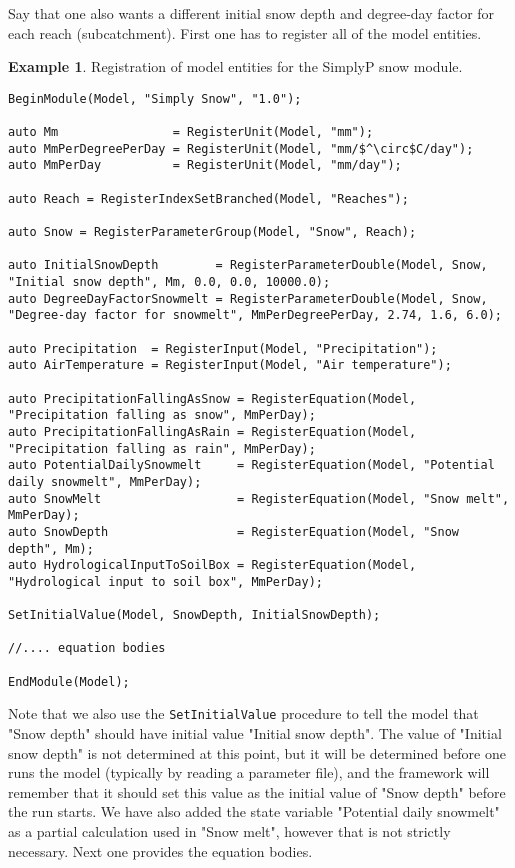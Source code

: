 \documentclass[11pt]{article}
\theoremstyle{definition}
\newtheorem{myexample}{Example}
\newenvironment{example}%
  {\begin{lrbox}{\examplebox}%
   \begin{minipage}{\dimexpr\linewidth-2\fboxsep}
   \begin{myexample}}%
  {\end{myexample}%
   \end{minipage}%
   \end{lrbox}%
   \begin{trivlist}
     \item[]\colorbox{silver}{\usebox\examplebox}
   \end{trivlist}}
\begin{document}
Say that one also wants a different initial snow depth and degree-day factor for each reach (subcatchment). First one has to register all of the model entities.
\begin{example}
Registration of model entities for the SimplyP snow module.
\begin{lstlisting}[style=mycpp,mathescape]
BeginModule(Model, "Simply Snow", "1.0");

auto Mm                = RegisterUnit(Model, "mm");
auto MmPerDegreePerDay = RegisterUnit(Model, "mm/$^\circ$C/day");
auto MmPerDay          = RegisterUnit(Model, "mm/day");

auto Reach = RegisterIndexSetBranched(Model, "Reaches");

auto Snow = RegisterParameterGroup(Model, "Snow", Reach);

auto InitialSnowDepth        = RegisterParameterDouble(Model, Snow, "Initial snow depth", Mm, 0.0, 0.0, 10000.0);
auto DegreeDayFactorSnowmelt = RegisterParameterDouble(Model, Snow, "Degree-day factor for snowmelt", MmPerDegreePerDay, 2.74, 1.6, 6.0);

auto Precipitation  = RegisterInput(Model, "Precipitation");
auto AirTemperature = RegisterInput(Model, "Air temperature");

auto PrecipitationFallingAsSnow = RegisterEquation(Model, "Precipitation falling as snow", MmPerDay);
auto PrecipitationFallingAsRain = RegisterEquation(Model, "Precipitation falling as rain", MmPerDay);
auto PotentialDailySnowmelt     = RegisterEquation(Model, "Potential daily snowmelt", MmPerDay);
auto SnowMelt                   = RegisterEquation(Model, "Snow melt", MmPerDay);
auto SnowDepth                  = RegisterEquation(Model, "Snow depth", Mm);
auto HydrologicalInputToSoilBox = RegisterEquation(Model, "Hydrological input to soil box", MmPerDay);

SetInitialValue(Model, SnowDepth, InitialSnowDepth);

//.... equation bodies

EndModule(Model);
\end{lstlisting}
\end{example}

Note that we also use the {\tt SetInitialValue} procedure to tell the model that "Snow depth" should have initial value "Initial snow depth". The value of "Initial snow depth" is not determined at this point, but it will be determined before one runs the model (typically by reading a parameter file), and the framework will remember that it should set this value as the initial value of "Snow depth" before the run starts. We have also added the state variable "Potential daily snowmelt" as a partial calculation used in "Snow melt", however that is not strictly necessary. Next one provides the equation bodies.
\end{document}
